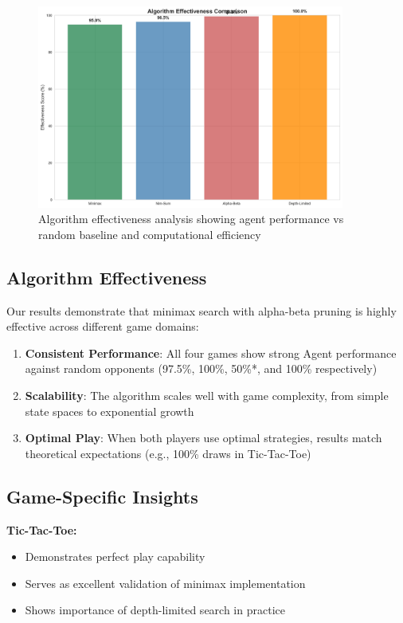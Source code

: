 \documentclass[12pt]{article}
\begin{document}
\begin{figure}[H]
\centering
\includegraphics[width=0.9\textwidth]{output/images/algorithm_effectiveness.png}
\caption{Algorithm effectiveness analysis showing agent performance vs random baseline and computational efficiency}
\label{fig:algorithm_effectiveness}
\end{figure}

\subsection{Algorithm Effectiveness}

Our results demonstrate that minimax search with alpha-beta pruning is highly effective across different game domains:

\begin{enumerate}
    \item \textbf{Consistent Performance}: All four games show strong Agent performance against random opponents (97.5\%, 100\%, 50\%*, and 100\% respectively)
    \item \textbf{Scalability}: The algorithm scales well with game complexity, from simple state spaces to exponential growth
    \item \textbf{Optimal Play}: When both players use optimal strategies, results match theoretical expectations (e.g., 100\% draws in Tic-Tac-Toe)
\end{enumerate}

\subsection{Game-Specific Insights}

\textbf{Tic-Tac-Toe:}
\begin{itemize}
    \item Demonstrates perfect play capability
    \item Serves as excellent validation of minimax implementation
    \item Shows importance of depth-limited search in practice
\end{itemize}
\end{document}
